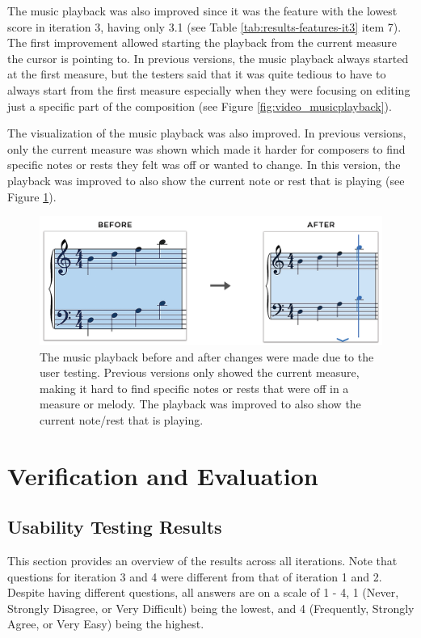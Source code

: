 				The music playback was also improved since it was the feature with the lowest score in iteration 3, having only 3.1 (see Table \ref{tab:results-features-it3} item 7). The first improvement allowed starting the playback from the current measure the cursor is pointing to. In previous versions, the music playback always started at the first measure, but the testers said that it was quite tedious to have to always start from the first measure especially when they were focusing on editing just a specific part of the composition (see Figure \ref{fig:video_musicplayback}). 

				The visualization of the music playback was also improved. In previous versions, only the current measure was shown which made it harder for composers to find specific notes or rests they felt was off or wanted to change. In this version, the playback was improved to also show the current note or rest that is playing (see Figure \ref{fig:before-after-playback}).

				\begin{figure}[h]
					\centering
					\includegraphics[scale=0.31]{figures/before-after-playback.png}
				    \caption{The music playback before and after changes were made due to the user testing. Previous versions only showed the current measure, making it hard to find specific notes or rests that were off in a measure or melody. The playback was improved to also show the current note/rest that is playing.}
				    \label{fig:before-after-playback}
				\end{figure}

	\section{Verification and Evaluation}
		\subsection{Usability Testing Results}
			This section provides an overview of the results across all iterations. Note that questions for iteration 3 and 4 were different from that of iteration 1 and 2. Despite having different questions, all answers are on a scale of 1 - 4, 1 (Never, Strongly Disagree, or Very Difficult) being the lowest, and 4 (Frequently, Strongly Agree, or Very Easy) being the highest. 

